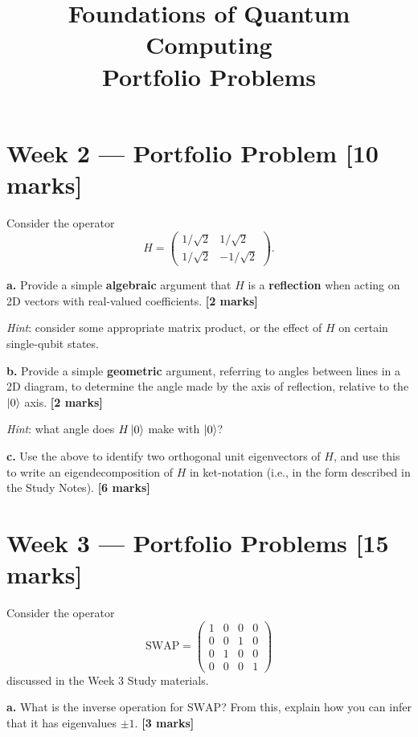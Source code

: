 \documentclass[12pt,a4paper]{article}
\title{\textbf{Foundations of Quantum Computing}\\[0.5em]
       \large Portfolio Problems}
\author{}
\date{}
\begin{document}
\maketitle
\thispagestyle{empty}

\section*{Week 2 --- Portfolio Problem \hfill [10 marks]}

Consider the operator
\[
  H = \begin{pmatrix} 1/\sqrt{2} & 1/\sqrt{2} \\ 1/\sqrt{2} & -1/\sqrt{2} \end{pmatrix}.
\]

\medskip
\textbf{a.}
Provide a simple \textbf{algebraic} argument that $H$ is a \textbf{reflection} when acting on 2D
vectors with real-valued coefficients.
\hfill\textbf{[2 marks]}

\smallskip
\textit{Hint}: consider some appropriate matrix product, or the effect of $H$ on certain
single-qubit states.

\medskip
\textbf{b.}
Provide a simple \textbf{geometric} argument, referring to angles between lines in a 2D diagram,
to determine the angle made by the axis of reflection, relative to the $\ket{0}$ axis.
\hfill\textbf{[2 marks]}

\smallskip
\textit{Hint}: what angle does $H\ket{0}$ make with $\ket{0}$?

\medskip
\textbf{c.}
Use the above to identify two orthogonal unit eigenvectors of $H$, and use this to write an
eigendecomposition of $H$ in ket-notation (i.e., in the form described in the Study Notes).
\hfill\textbf{[6 marks]}

\section*{Week 3 --- Portfolio Problems \hfill [15 marks]}

Consider the operator
\[
  \mathrm{SWAP} =
  \begin{pmatrix}1&0&0&0\\0&0&1&0\\0&1&0&0\\0&0&0&1\end{pmatrix}
\]
discussed in the Week 3 Study materials.

\medskip
\textbf{a.}
What is the inverse operation for $\mathrm{SWAP}$? From this, explain how you can infer that it
has eigenvalues $\pm 1$.
\hfill\textbf{[3 marks]}
\end{document}
